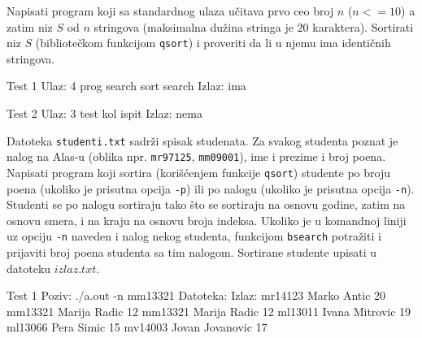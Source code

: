 \begin{Exercise}[label=514]
  Napisati program koji sa standardnog ulaza u\v citava prvo ceo broj
  $n$ ($n <= 10$) a zatim niz $S$ od $n$ stringova (maksimalna du\v
  zina stringa je $20$ karaktera). Sortirati niz $S$ (bibliote\v{c}kom
  funkcijom \verb|qsort|) i proveriti da li u njemu ima identi\v{c}nih
  stringova.
  
  \begin{miditest}
    \begin{test}{Test 1}
      Ulaz:   4 prog search sort search
      Izlaz:  ima
    \end{test}
  \end{miditest}
  \begin{miditest}
    \begin{test}{Test 2}
      Ulaz:   3 test kol ispit
      Izlaz:  nema
    \end{test}
  \end{miditest}
  
\end{Exercise}

\begin{Exercise}[label=515]
  Datoteka \texttt{studenti.txt} sadr\v zi spisak studenata. Za svakog
  studenta poznat je nalog na Alas-u (oblika npr. \texttt{mr97125},
  \texttt{mm09001}), ime i prezime i broj poena. Napisati program koji
  sortira (kori\v s\' cenjem funkcije \verb|qsort|) studente po broju
  poena (ukoliko je prisutna opcija \verb"-p") ili po nalogu (ukoliko
  je prisutna opcija \verb"-n"). Studenti se po nalogu sortiraju tako
  \v sto se sortiraju na osnovu godine, zatim na osnovu smera, i na
  kraju na osnovu broja indeksa. Ukoliko je u komandnoj liniji uz
  opciju \verb"-n" naveden i nalog nekog studenta, funkcijom
  \verb|bsearch| potra\v ziti i prijaviti broj poena studenta sa tim
  nalogom. Sortirane studente upisati u datoteku $izlaz.txt$.
  
  \begin{maxitest}
    \begin{test}{Test 1}
Poziv: ./a.out -n mm13321
Datoteka:                         Izlaz:
mr14123 Marko Antic 20            mm13321 Marija Radic 12
mm13321 Marija Radic 12
ml13011 Ivana Mitrovic 19
ml13066 Pera Simic 15
mv14003 Jovan Jovanovic 17
    \end{test}
  \end{maxitest}
  
\end{Exercise}

